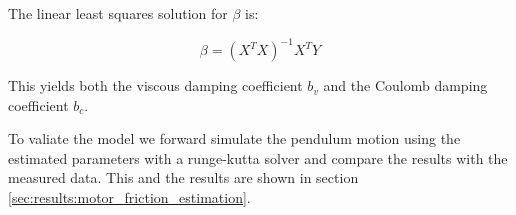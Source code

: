The linear least squares solution for \( \beta \) is:

\[
\beta = (X^T X)^{-1} X^T Y
\]

This yields both the viscous damping coefficient \( b_v \) and the Coulomb damping coefficient \( b_c \).

To valiate the model we forward simulate the pendulum motion using the estimated parameters with a runge-kutta solver and compare the results with the measured data. This and the results are shown in section \ref{sec:results:motor_friction_estimation}.
